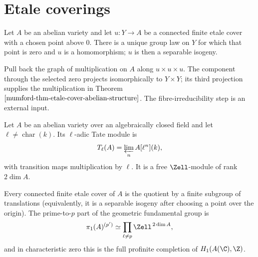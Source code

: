 \section{Etale coverings}
\label{mumford-IV18}

\begin{theorem}
\label{mumford-thm-etale-cover-abelian-structure}
Let $A$ be an abelian variety and let $u:Y\to A$ be a connected finite etale
cover with a chosen point above $0$.  There is a unique group law on $Y$ for
which that point is zero and $u$ is a homomorphism; $u$ is then a separable
isogeny.
\notready
\end{theorem}

\begin{lemma}
\label{mumford-lem-etale-cover-graph}
Pull back the graph of multiplication on $A$ along $u\times u\times u$.
The component through the selected zero projects isomorphically to
$Y\times Y$; its third projection supplies the multiplication in
Theorem~$\ref{mumford-thm-etale-cover-abelian-structure}$.  The
fibre-irreducibility step is an external input.
\notready
\end{lemma}

\begin{definition}
\label{mumford-def-tate-module}
Let $A$ be an abelian variety over an algebraically closed field and let
$\ell\ne\operatorname{char}(k)$.  Its $\ell$-adic Tate module is
\[
 T_\ell(A)=\varprojlim_n A[\ell^n](k),
\]
with transition maps multiplication by $\ell$.  It is a free $\Zell$-module
of rank $2\dim A$.
\notready
\end{definition}

\begin{proposition}
\label{mumford-prop-etale-coverings-av}
Every connected finite etale cover of $A$ is the quotient by a finite subgroup
of translations (equivalently, it is a separable isogeny after choosing a
point over the origin).  The prime-to-$p$ part of the
geometric fundamental group is
\[
 \pi_1(A)^{(p')}\simeq\prod_{\ell\ne p}\Zell^{\,2\dim A},
\]
and in characteristic zero this is the full profinite completion of
$H_1(A(\C),\Z)$.
\notready
\end{proposition}

